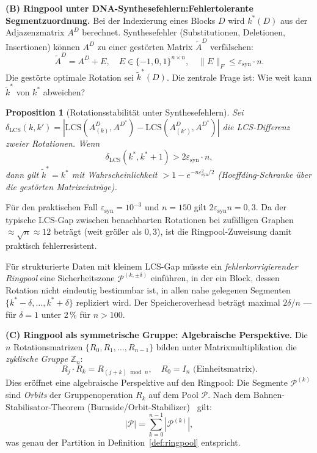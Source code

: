 ﻿\documentclass[a4paper,12pt]{article}
\theoremstyle{definition}
\theoremstyle{plain}
\newtheorem{proposition}{Proposition}[section]
\begin{document}
\textbf{(B) Ringpool unter DNA-Synthesefehlern:\linebreak[2]
  Fehlertolerante Segmentzuordnung.}
Bei der Indexierung eines Blocks $D$ wird $k^*(D)$ aus der Adjazenzmatrix
$A^D$ berechnet.  Synthesefehler (Substitutionen, Deletionen, Insertionen)
können $A^D$ zu einer gestörten Matrix $\tilde{A}^D$ verfälschen:
\[
  \tilde{A}^D = A^D + E, \quad E \in \{-1, 0, 1\}^{n \times n},
  \quad \|E\|_F \le \varepsilon_{\mathrm{syn}} \cdot n.
\]
Die gestörte optimale Rotation sei $\tilde{k}^*(D)$.  Die zentrale Frage
ist: Wie weit kann $\tilde{k}^*$ von $k^*$ abweichen?

\begin{proposition}[Rotationsstabilität unter Synthesefehlern]
\label{prop:rotation_stabil}
  Sei $\delta_{\mathrm{LCS}}(k, k') = |\mathrm{LCS}(A^D_{(k)}, A^{D^*})
  - \mathrm{LCS}(A^D_{(k')}, A^{D^*})|$ die LCS-Differenz zweier
  Rotationen.  Wenn
  \[
    \delta_{\mathrm{LCS}}(k^*, k^*+1) > 2 \varepsilon_{\mathrm{syn}} \cdot n,
  \]
  dann gilt $\tilde{k}^* = k^*$ mit Wahrscheinlichkeit $> 1 - e^{-n \varepsilon_{\mathrm{syn}}^2/2}$
  (Hoeffding-Schranke über die gestörten Matrixeinträge).
\end{proposition}

Für den praktischen Fall $\varepsilon_{\mathrm{syn}} = 10^{-3}$ und
$n = 150$ gilt $2 \varepsilon_{\mathrm{syn}} n = 0{,}3$.  Da der typische
LCS-Gap zwischen benachbarten Rotationen bei zufälligen Graphen
$\approx \sqrt{n} \approx 12$ beträgt (weit größer als $0{,}3$), ist
die Ringpool-Zuweisung damit praktisch fehlerresistent.

Für strukturierte Daten mit kleinem LCS-Gap müsste ein
\emph{fehlerkorrigierender Ringpool} eine Sicherheitszone
$\mathcal{P}^{(k,\pm\delta)}$ einführen, in der ein Block, dessen
Rotation nicht eindeutig bestimmbar ist, in allen nahe gelegenen
Segmenten $\{k^*-\delta, \ldots, k^*+\delta\}$ repliziert wird.  Der
Speicheroverhead beträgt maximal $2\delta/n$ --- für $\delta = 1$
unter $2\,\%$ für $n > 100$.

\textbf{(C) Ringpool als symmetrische Gruppe: Algebraische Perspektive.}
Die $n$ Rotationsmatrizen $\{R_0, R_1, \ldots, R_{n-1}\}$ bilden unter
Matrixmultiplikation die \emph{zyklische Gruppe} $\mathbb{Z}_n$:
\[
  R_j \cdot R_k = R_{(j+k) \bmod n},
  \quad R_0 = I_n \text{ (Einheitsmatrix)}.
\]
Dies eröffnet eine algebraische Perspektive auf den Ringpool:
Die Segmente $\mathcal{P}^{(k)}$ sind \emph{Orbits} der Gruppenoperation
$R_k$ auf dem Pool $\mathcal{P}$.  Nach dem Bahnen-Stabilisator-Theorem
(Burnside/Orbit-Stabilizer)~\cite{knuth1998} gilt:
\[
  |\mathcal{P}| = \sum_{k=0}^{n-1} |\mathcal{P}^{(k)}|,
\]
was genau der Partition in Definition~\ref{def:ringpool} entspricht.
\end{document}
